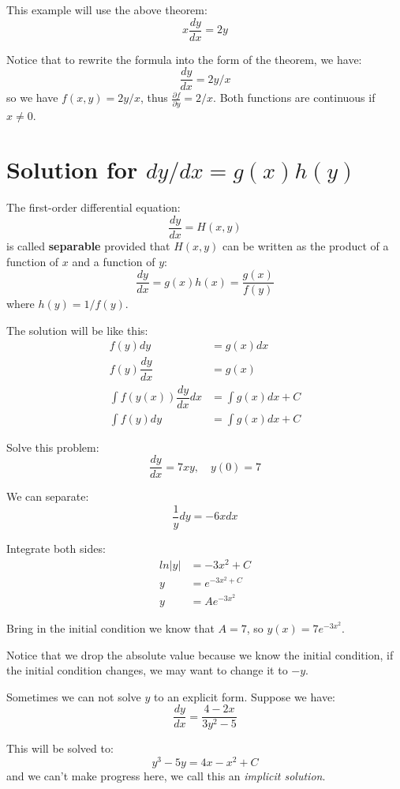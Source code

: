 \begin{example}
   This example will use the above theorem:
   \[
    x \dfrac{dy}{dx} = 2y
   \]

   Notice that to rewrite the formula into the form of the theorem, we have:
   \[
    \dfrac{dy}{dx} = 2y/x
   \]
    so we have \(f(x, y) = 2y/x\), thus \(\frac{\partial f}{\partial y} = 2/x\). 
    Both functions are continuous if \(x \neq 0\). 
\end{example}

\section{Solution for \(dy/dx = g(x)h(y)\)}

The first-order differential equation:
\[
    \dfrac{dy}{dx} = H(x, y)
\]
is called \textbf{separable} provided that \(H(x, y)\) can be written as the product of a function of \(x\) and a function of \(y\):
\[
    \dfrac{dy}{dx} = g(x)h(x) = \dfrac{g(x)}{f(y)}
\]   
where \(h(y) = 1/f(y)\). 

The solution will be like this:
\begin{align*}
    f(y)dy &= g(x)dx \\
    f(y)\dfrac{dy}{dx} &= g(x)\\
    \int f(y(x)) \dfrac{dy}{dx} dx &= \int g(x) dx + C\\
    \int f(y) dy &= \int g(x) dx + C
\end{align*}

\begin{example}
    Solve this problem:
    \[
        \dfrac{dy}{dx} = 7xy, \quad y(0) = 7
    \]

    We can separate:
    \[
        \dfrac{1}{y} dy = -6x dx
    \] 

    Integrate both sides:
    \begin{align*}
        ln |y| &= -3x^2 + C \\
        y & = e^{-3x^ 2 + C} \\
        y & = A e^{-3x^2}
    \end{align*}

    Bring in the initial condition we know that \(A = 7\), so \(y(x) = 7e^{-3x^2}\).

    Notice that we drop the absolute value because we know the initial condition, if the initial condition changes, we may want to change it to \(-y\). 
\end{example}

\begin{example}
    Sometimes we can not solve \(y\) to an explicit form.
    Suppose we have:
    \[
        \dfrac{dy}{dx} = \dfrac{4-2x}{3y^2-5}
    \] 

    This will be solved to:
    \[
        y^3 - 5y = 4x - x^2 + C
    \]
    and we can't make progress here, we call this an \textit{implicit solution}. 
\end{example}


